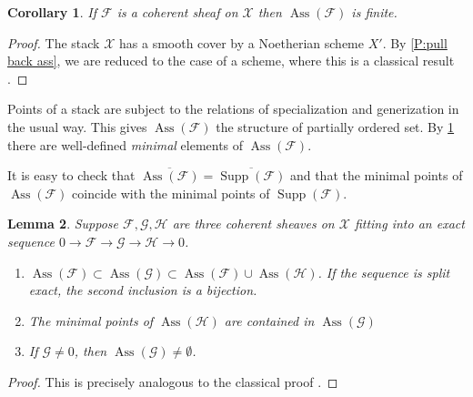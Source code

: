 \documentclass[11pt]{amsart}
\newcommand{\ms}[1]{\mathscr #1}
\newcommand{\widebar}[1]{\overline{#1}}
\DeclareMathOperator{\ass}{Ass}
\renewcommand{\[}{[\!\hspace{0.03em}[}
\renewcommand{\]}{]\!\hspace{0.03em}]}
\renewcommand{\(}{(\!\hspace{0.03em}(}
\renewcommand{\)}{)\!\hspace{0.03em})}
\newtheorem{lem}{Lemma}[subsubsection]%
\newtheorem{cor}[lem]{Corollary}
\theoremstyle{definition}
\theoremstyle{remark}
\begin{document}
\begin{cor}\label{C:ass finite} If $\ms F$ is a coherent sheaf on $\ms X$ then $\ass(\ms F)$ is finite.
\end{cor}
\begin{proof} The stack $\ms X$ has a smooth cover by a Noetherian 
scheme $X'$.  By \ref{P:pull back ass}, we are reduced to the case of 
a scheme, where this is a classical result \cite[6.5]{matsumura}.
\end{proof}
Points of a stack are subject to the relations of specialization and 
generization in the usual way. This gives $\operatorname{Ass}(\ms F)$ 
the structure of partially ordered set.  By \ref{C:ass finite}  
there are well-defined \emph{minimal\/} elements of 
$\operatorname{Ass}(\ms F)$.

It is easy to check that $\widebar{\operatorname{Ass}(\ms 
F)}=\widebar{\operatorname{Supp}(\ms F)}$ and that the minimal points of 
$\operatorname{Ass}(\ms F)$ coincide with the minimal points of 
$\operatorname{Supp}(\ms F)$.

\begin{lem}\label{L:ass lemma} Suppose $\ms F,\ms G,\ms H$ are three coherent sheaves 
on $\ms X$ fitting into an exact sequence $0\to \ms F\to\ms G\to\ms H\to 0$.
\begin{enumerate}
    \item $\operatorname{Ass}(\ms F)\subset\operatorname{Ass}(\ms G)\subset\operatorname{Ass}(\ms 
    F)\cup\operatorname{Ass}(\ms H)$.  If the sequence is split exact, 
    the second inclusion is a bijection.

    \item  The minimal points of $\operatorname{Ass}(\ms H)$ are 
    contained in $\operatorname{Ass}(\ms G)$

    \item If $\ms G\neq 0$, then $\operatorname{Ass}(\ms 
    G)\neq\emptyset$.
\end{enumerate}
\end{lem}
\begin{proof} This is precisely analogous to the classical proof 
\cite[\S6]{matsumura}.
\end{proof}
\end{document}
